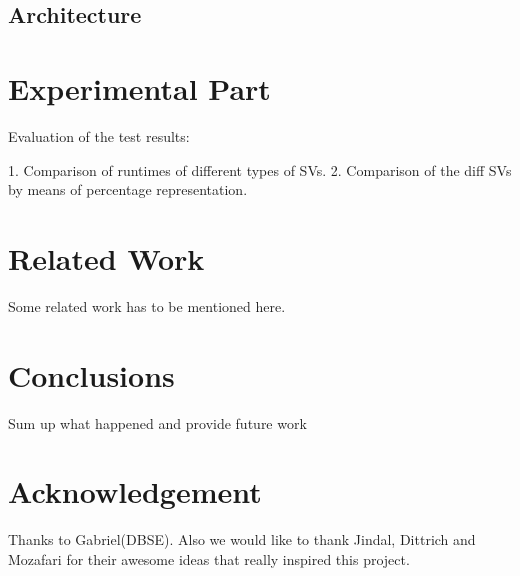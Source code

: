 \documentclass[10pt, conference, compsocconf]{IEEEtran}
\begin{document}
\subsection{Architecture}

\section{Experimental Part}
Evaluation of the test results:
 
1. Comparison of runtimes of different types of SVs.
2. Comparison of the diff SVs by means of percentage representation.

\section{Related Work}
Some related work has to be mentioned here.

\section{Conclusions}
Sum up what happened and provide future work

\section*{Acknowledgement}
Thanks to Gabriel(DBSE). Also we would like to thank Jindal, Dittrich and Mozafari for their awesome ideas that really inspired this project.
\end{document}
